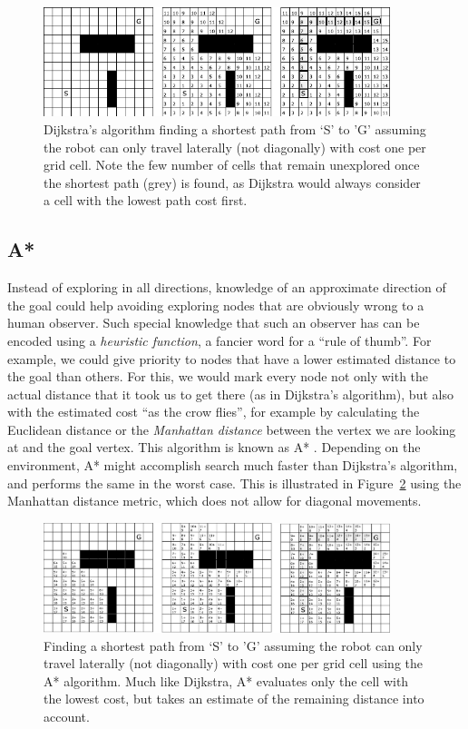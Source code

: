\begin{figure}[htb]
\centering
\includegraphics[width=0.9\textwidth]{figs/dijkstragrid}
\caption{Dijkstra's algorithm finding a shortest path from `S' to 'G' assuming the robot can only travel laterally (not diagonally) with cost one per grid cell. Note the few number of cells that remain unexplored once the shortest path (grey) is found, as Dijkstra would always consider a cell with the lowest path cost first.\label{fig:dijkstragrid}}
\end{figure}

\subsection{A*}\label{sec:astar}
Instead of exploring in all directions, knowledge of an approximate direction of the goal could help avoiding exploring nodes that are obviously wrong to a human observer. Such special knowledge that such an observer has can be encoded using a \emph{heuristic function}, a fancier word for a ``rule of thumb''. For example, we could give priority to nodes that have a lower estimated distance to the goal than others. For this, we would mark every node not only with the actual distance that it took us to get there (as in Dijkstra's algorithm), but also with the estimated cost ``as the crow flies'', for example by calculating the Euclidean distance or the \emph{Manhattan distance} between the vertex we are looking at and the goal vertex. This algorithm is known as A* \cite{hart1968formal}. Depending on the environment, A* might accomplish search much faster than Dijkstra's algorithm, and performs the same in the worst case. This is illustrated in Figure~\ref{fig:astargrid} using the Manhattan distance metric, which does not allow for diagonal movements.

\begin{figure}[htb]
\centering
\includegraphics[width=0.9\textwidth]{figs/astargrid}
\caption{Finding a shortest path from `S' to 'G' assuming the robot can only travel laterally (not diagonally) with cost one per grid cell using the A* algorithm. Much like Dijkstra, A* evaluates only the cell with the lowest cost, but takes an estimate of the remaining distance into account.\label{fig:astargrid}}
\end{figure}

